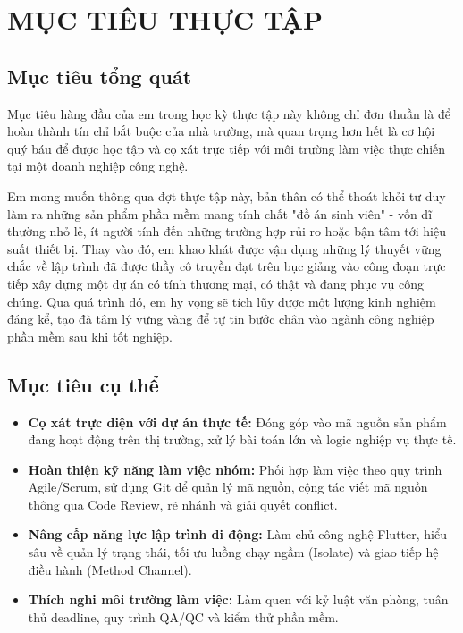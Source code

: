 \documentclass[12pt, a4paper]{article}
\begin{document}
\section{MỤC TIÊU THỰC TẬP}
\subsection{Mục tiêu tổng quát}
Mục tiêu hàng đầu của em trong học kỳ thực tập này không chỉ đơn thuần là để hoàn thành tín chỉ bắt buộc của nhà trường, mà quan trọng hơn hết là cơ hội quý báu để được học tập và cọ xát trực tiếp với môi trường làm việc thực chiến tại một doanh nghiệp công nghệ. 

Em mong muốn thông qua đợt thực tập này, bản thân có thể thoát khỏi tư duy làm ra những sản phẩm phần mềm mang tính chất "đồ án sinh viên" - vốn dĩ thường nhỏ lẻ, ít người tính đến những trường hợp rủi ro hoặc bận tâm tới hiệu suất thiết bị. Thay vào đó, em khao khát được vận dụng những lý thuyết vững chắc về lập trình đã được thầy cô truyền đạt trên bục giảng vào công đoạn trực tiếp xây dựng một dự án có tính thương mại, có thật và đang phục vụ công chúng. Qua quá trình đó, em hy vọng sẽ tích lũy được một lượng kinh nghiệm đáng kể, tạo đà tâm lý vững vàng để tự tin bước chân vào ngành công nghiệp phần mềm sau khi tốt nghiệp.

\subsection{Mục tiêu cụ thể}
\begin{itemize}
    \item \textbf{Cọ xát trực diện với dự án thực tế:} Đóng góp vào mã nguồn sản phẩm đang hoạt động trên thị trường, xử lý bài toán lớn và logic nghiệp vụ thực tế.
    \item \textbf{Hoàn thiện kỹ năng làm việc nhóm:} Phối hợp làm việc theo quy trình Agile/Scrum, sử dụng Git để quản lý mã nguồn, cộng tác viết mã nguồn thông qua Code Review, rẽ nhánh và giải quyết conflict.
    \item \textbf{Nâng cấp năng lực lập trình di động:} Làm chủ công nghệ Flutter, hiểu sâu về quản lý trạng thái, tối ưu luồng chạy ngầm (Isolate) và giao tiếp hệ điều hành (Method Channel).
    \item \textbf{Thích nghi môi trường làm việc:} Làm quen với kỷ luật văn phòng, tuân thủ deadline, quy trình QA/QC và kiểm thử phần mềm.
\end{itemize}
\end{document}
